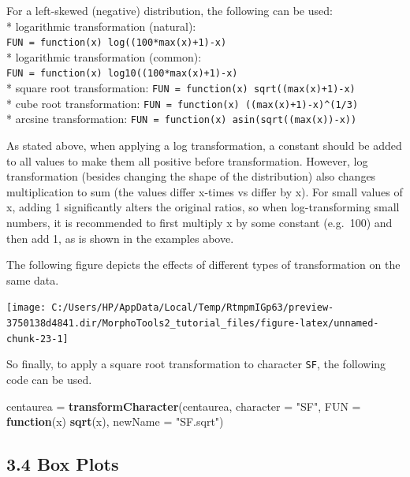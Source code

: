 \documentclass[
]{article}
\newenvironment{Shaded}{\begin{snugshade}}{\end{snugshade}}
\newcommand{\ControlFlowTok}[1]{\textcolor[rgb]{0.13,0.29,0.53}{\textbf{#1}}}
\newcommand{\DataTypeTok}[1]{\textcolor[rgb]{0.13,0.29,0.53}{#1}}
\newcommand{\KeywordTok}[1]{\textcolor[rgb]{0.13,0.29,0.53}{\textbf{#1}}}
\newcommand{\NormalTok}[1]{#1}
\newcommand{\StringTok}[1]{\textcolor[rgb]{0.31,0.60,0.02}{#1}}
\begin{document}
For a left-skewed (negative) distribution, the following can be used:\\
* logarithmic transformation (natural):
\texttt{FUN\ =\ function(x)\ log((100*max(x)+1)-x)}\\
* logarithmic transformation (common):
\texttt{FUN\ =\ function(x)\ log10((100*max(x)+1)-x)}\\
* square root transformation:
\texttt{FUN\ =\ function(x)\ sqrt((max(x)+1)-x)}\\
* cube root transformation:
\texttt{FUN\ =\ function(x)\ ((max(x)+1)-x)\^{}(1/3)}\\
* arcsine transformation:
\texttt{FUN\ =\ function(x)\ asin(sqrt((max(x))-x))}

As stated above, when applying a log transformation, a constant should
be added to all values to make them all positive before transformation.
However, log transformation (besides changing the shape of the
distribution) also changes multiplication to sum (the values differ
x-times vs differ by x). For small values of x, adding 1 significantly
alters the original ratios, so when log-transforming small numbers, it
is recommended to first multiply x by some constant (e.g.~100) and then
add 1, as is shown in the examples above.

The following figure depicts the effects of different types of
transformation on the same data.

\begin{center}\texttt{[image: C:/Users/HP/AppData/Local/Temp/RtmpmIGp63/preview-3750138d4841.dir/MorphoTools2\_tutorial\_files/figure-latex/unnamed-chunk-23-1]} \end{center}

So finally, to apply a square root transformation to character
\texttt{SF}, the following code can be used.

\begin{Shaded}
\begin{Highlighting}[]
\NormalTok{centaurea =}\StringTok{ }\KeywordTok{transformCharacter}\NormalTok{(centaurea, }\DataTypeTok{character =} \StringTok{"SF"}\NormalTok{, }\DataTypeTok{FUN =} \ControlFlowTok{function}\NormalTok{(x) }\KeywordTok{sqrt}\NormalTok{(x), }
                               \DataTypeTok{newName =} \StringTok{"SF.sqrt"}\NormalTok{)}
\end{Highlighting}
\end{Shaded}

\hypertarget{box-plots}{%
\subsection{3.4 Box Plots}\label{box-plots}}
\end{document}
